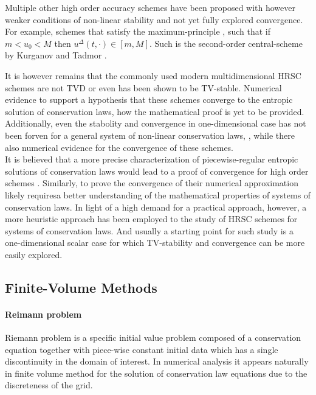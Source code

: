 Multiple other high order accuracy schemes have been proposed with however weaker conditions of non-linear stability and not yet fully explored convergence. For example, schemes that satisfy the maximum-principle \ie, such that if $m < u_0 < M$ then $u^{\Delta}(t,\cdot)\in[m, M]$. Such is the second-order central-scheme by Kurganov and Tadmor \citep{Kurganov:2000}. 

It is however remains that the commonly used modern multidimensional HRSC schemes are not TVD or even has been shown to be TV-stable. Numerical evidence to support a hypothesis that these schemes converge to the entropic solution of conservation laws, how the mathematical proof is yet to be provided. Additionally, even the stabolity and convergence in one-dimensional case has not been forven for a general system of non-linear conservation laws, \cite{LeVeque:2002}, while there also numerical evidence for the convergence of these schemes. \\

It is believed that a more precise characterization of piecewise-regular entropic solutions of conservation laws would lead to a proof of convergence for high order schemes \cite{Tadmor1998}. Similarly, to prove the convergence of their numerical approximation likely requiresa  better understanding of the mathematical properties of systems of conservation laws. In light of a high demand for a practical approach, however, a more heuristic approach has been employed to the study of HRSC schemes for systems of conservation laws. And usually a starting point for such study is a one-dimensional scalar case for which TV-stability and convergence can be more easily explored.



\subsection{Finite-Volume Methods}


\paragraph{Reimann problem} 

Riemann problem is a specific initial value problem composed of a conservation equation together with piece-wise constant initial data which has a single discontinuity in the domain of interest. In numerical analysis it appears naturally in finite volume method for the solution of conservation law equations due to the discreteness of the grid. 

